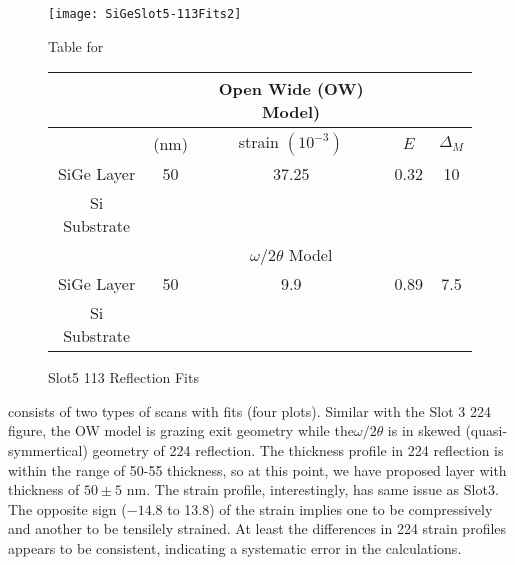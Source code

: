 \begin{figure}[h]%
\caption{Slot5 113 Reflection Fits}
\label{Slot5-113}
\begin{minipage}{0.85\linewidth}
\texttt{[image: SiGeSlot5-113Fits2]}
\end{minipage}
\begin{minipage}{\linewidth}
\centering
\vspace{10pt}
Table for \\
\vspace{5pt}
\begin{tabular}{c|cccc}
			& 	&Open Wide (OW) Model)	 \\
\hline
			&	(nm)	&	strain	 $(10^{-3})$&	$E$ &  $\Delta_M$\\
\hline
SiGe Layer		&  	50	&      37.25	 & 0.32& 10	\\
Si Substrate		&	\textemdash & \textemdash&\textemdash\ &\textemdash	\\
\hline
			& &$\omega/2\theta$ Model \\
\hline
SiGe Layer		&	50	&9.9	& 0.89	& 7.5	\\
Si Substrate		&	\textemdash & \textemdash&\textemdash\ &\textemdash
\end{tabular}
\end{minipage}
\end{figure}

 consists of two types of scans with fits (four plots).  Similar with the Slot 3 224 figure, the OW model is grazing exit geometry while the$\omega/2\theta$ is in skewed (quasi-symmertical) geometry of 224 reflection.  The thickness profile in 224 reflection is within the range of 50-55 thickness, so at this point, we have proposed layer with thickness of $50\pm5$ nm.  The strain profile, interestingly, has same issue as Slot3.  The opposite sign ($-14.8$ to 13.8) of the strain implies one to be compressively and another to be tensilely strained.  At least the differences in 224 strain profiles appears to be consistent, indicating a systematic error in the calculations.


